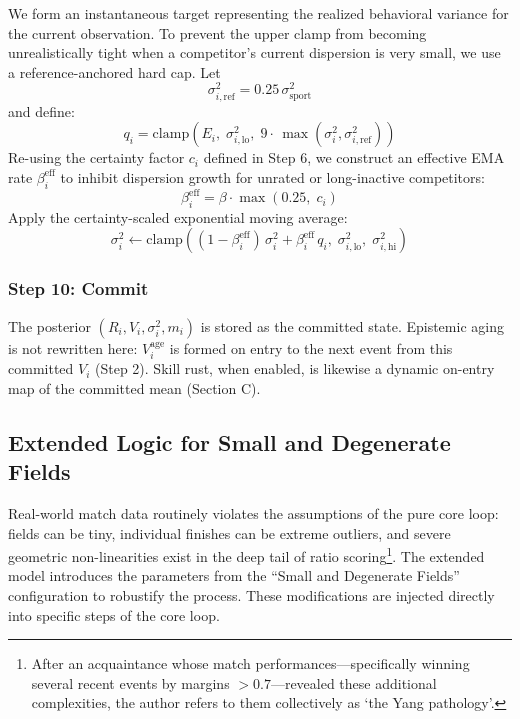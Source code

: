 \documentclass[12pt]{article}
\begin{document}
	We form an instantaneous target representing the realized behavioral variance for the current observation. To prevent the upper clamp from becoming unrealistically tight when a competitor's current dispersion is very small, we use a reference-anchored hard cap. Let
	\begin{equation}
		\sigma_{i,\mathrm{ref}}^2 = 0.25\,\sigma_{\mathrm{sport}}^2
	\end{equation}
	and define:
	\begin{equation}
		q_i = \mathrm{clamp}\left(E_i,\; \sigma_{i,\mathrm{lo}}^2,\; 9\cdot\,\max\!\left(\sigma_i^2,\sigma_{i,\mathrm{ref}}^2\right)\right)
	\end{equation}
	Re-using the certainty factor $c_i$ defined in Step 6, we construct an effective EMA rate $\beta_i^{\mathrm{eff}}$ to inhibit dispersion growth for unrated or long-inactive competitors:
	\begin{equation}
		\beta_i^{\mathrm{eff}} = \beta \cdot \max\!\left(0.25,\; c_i\right)
	\end{equation}
	Apply the certainty-scaled exponential moving average:
	\begin{equation}
		\sigma_i^2 \leftarrow \mathrm{clamp}\!\left((1 - \beta_i^{\mathrm{eff}})\,\sigma_i^2 + \beta_i^{\mathrm{eff}}\, q_i,\; \sigma_{i,\mathrm{lo}}^2,\; \sigma_{i,\mathrm{hi}}^2\right)
	\end{equation}

	\subsubsection*{Step 10: Commit}
	The posterior $(R_i, V_i, \sigma_i^2, m_i)$ is stored as the committed state. Epistemic aging is not rewritten here: $V_i^{\mathrm{age}}$ is formed on entry to the next event from this committed $V_i$ (Step 2). Skill rust, when enabled, is likewise a dynamic on-entry map of the committed mean (Section C).

	\subsection{Extended Logic for Small and Degenerate Fields}
	Real-world match data routinely violates the assumptions of the pure core loop: fields can be tiny, individual finishes can be extreme outliers, and severe geometric non-linearities exist in the deep tail of ratio scoring\footnote{After an acquaintance whose match performances---specifically winning several recent events by margins $> 0.7$---revealed these additional complexities, the author refers to them collectively as `the Yang pathology'.}. The extended model introduces the parameters from the ``Small and Degenerate Fields'' configuration to robustify the process. These modifications are injected directly into specific steps of the core loop.
\end{document}
